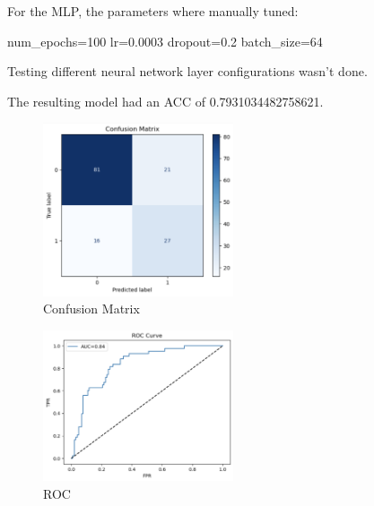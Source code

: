 For the MLP, the parameters where manually tuned:

num\_epochs=100
lr=0.0003
dropout=0.2
batch\_size=64

Testing different neural network layer configurations wasn't done.

The resulting model had an ACC of 0.7931034482758621.

\begin{figure}[h!]
    \centering
    \includegraphics[width=0.5\textwidth]{Plots/ConfusionMatrixMLP.png}
    \caption{Confusion Matrix}
    \label{fig:my_label}
\end{figure}

\begin{figure}[h!]
    \centering
    \includegraphics[width=0.5\textwidth]{Plots/RoCMLP.png}
    \caption{ROC}
    \label{fig:my_label}
\end{figure}

